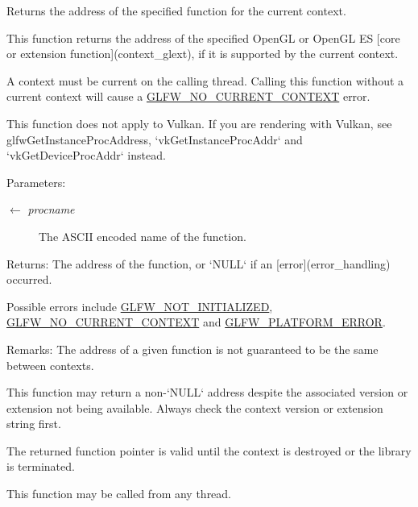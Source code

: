 Returns the address of the specified function for the current context. 

This function returns the address of the specified OpenGL or OpenGL ES \mbox{[}core or extension function\mbox{]}(context\_\-glext), if it is supported by the current context.

A context must be current on the calling thread. Calling this function without a current context will cause a \hyperlink{group__errors_ga8290386e9528ccb9e42a3a4e16fc0d0}{GLFW\_\-NO\_\-CURRENT\_\-CONTEXT} error.

This function does not apply to Vulkan. If you are rendering with Vulkan, see glfwGetInstanceProcAddress, `vkGetInstanceProcAddr` and `vkGetDeviceProcAddr` instead.

\begin{Desc}
\item[Parameters:]
\begin{description}
\item[\mbox{$\leftarrow$} {\em procname}]The ASCII encoded name of the function. \end{description}
\end{Desc}
\begin{Desc}
\item[Returns:]The address of the function, or `NULL` if an \mbox{[}error\mbox{]}(error\_\-handling) occurred.\end{Desc}
Possible errors include \hyperlink{group__errors_g2374ee02c177f12e1fa76ff3ed15e14a}{GLFW\_\-NOT\_\-INITIALIZED}, \hyperlink{group__errors_ga8290386e9528ccb9e42a3a4e16fc0d0}{GLFW\_\-NO\_\-CURRENT\_\-CONTEXT} and \hyperlink{group__errors_gd44162d78100ea5e87cdd38426b8c7a1}{GLFW\_\-PLATFORM\_\-ERROR}.

\begin{Desc}
\item[Remarks:]The address of a given function is not guaranteed to be the same between contexts.

This function may return a non-`NULL` address despite the associated version or extension not being available. Always check the context version or extension string first.\end{Desc}
The returned function pointer is valid until the context is destroyed or the library is terminated.

This function may be called from any thread.

